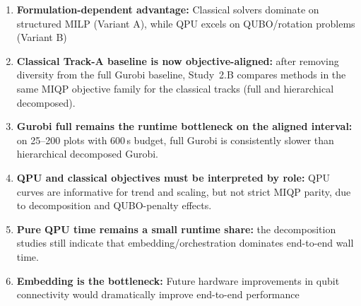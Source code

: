 \begin{enumerate}
    \item \textbf{Formulation-dependent advantage:} Classical solvers dominate on structured MILP (Variant A), while QPU excels on QUBO/rotation problems (Variant B)

    \item \textbf{Classical Track-A baseline is now objective-aligned:} after removing diversity from the full Gurobi baseline, Study~2.B compares methods in the same MIQP objective family for the classical tracks (full and hierarchical decomposed).

    \item \textbf{Gurobi full remains the runtime bottleneck on the aligned interval:} on 25--200 plots with 600\,s budget, full Gurobi is consistently slower than hierarchical decomposed Gurobi.

    \item \textbf{QPU and classical objectives must be interpreted by role:} QPU curves are informative for trend and scaling, but not strict MIQP parity, due to decomposition and QUBO-penalty effects.

    \item \textbf{Pure QPU time remains a small runtime share:} the decomposition studies still indicate that embedding/orchestration dominates end-to-end wall time.

    \item \textbf{Embedding is the bottleneck:} Future hardware improvements in qubit connectivity would dramatically improve end-to-end performance
\end{enumerate}